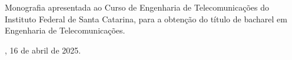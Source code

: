\begin{folhadeaprovacao}

    \begin{center}
        {\ABNTEXchapterfont\normalfont\large\imprimirautor}

        \vspace*{2cm}

        \ABNTEXchapterfont\normalfont\large\imprimirtitulo
        
    
        \vspace*{2cm}

\hspace{.45\textwidth}
\begin{minipage}{.5\textwidth}
\SingleSpacing
{\normalsize Monografia apresentada ao Curso de Engenharia de Telecomunicações do Instituto Federal de Santa Catarina, para a obtenção do título de bacharel em Engenharia de Telecomunicações.}
\end{minipage}%
        
        \vspace*{2cm}

        \imprimirlocal, 16 de abril de 2025.

    \end{center}

    \vfill

    \setlength{\ABNTEXsignskip}{1.5cm}
  
\end{folhadeaprovacao}
